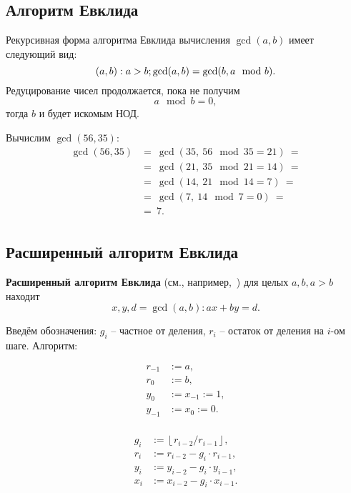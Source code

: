 \subsection{Алгоритм Евклида}

Рекурсивная форма алгоритма Евклида вычисления $\gcd(a,b)$ имеет следующий вид:
    \[\mathbb{(}a,b): a>b;  \gcd(a,b) = \gcd(b, a \mod b). \]
Редуцирование чисел продолжается, пока не получим
    \[ a \mod b = 0, \]
тогда $b$ и будет искомым НОД.

\example
Вычислим $\gcd(56, 35)$:
\[ \begin{array}{ll}
    \gcd(56, 35) & =~ \gcd(35, ~ 56 \mod 35 = 21) ~= \\
    & =~ \gcd(21, ~ 35 \mod 21 = 14) ~= \\
    & =~ \gcd(14, ~ 21 \mod 14 = 7) ~= \\
    & =~ \gcd(7, ~ 14 \mod 7 = 0) ~= \\
    & =~ 7. \\
\end{array} \]
\exampleend


\subsection{Расширенный алгоритм Евклида}

\textbf{Расширенный алгоритм Евклида} (см., например,~\cite[8.8 Наибольшие общие делители и алгоритм Евклида]{Aho:1979}) для целых $a, b, a > b$ находит
    \[ x, y, d = \gcd(a,b): ax + by = d. \]

Введём обозначения: $g_i$ -- частное от деления, $r_i$ -- остаток от деления на $i$-ом шаге. Алгоритм:

\[\begin{array}{ll}
	r_{-1} & := a, \\
	r_0 & := b, \\
	y_0 & := x_{-1} := 1, \\
	y_{-1} & := x_0 := 0. \\
\end{array}\]

\[\begin{array}{ll}
	g_i & := \left\lfloor r_{i-2} / r_{i-1} \right\rfloor, \\
	r_i & := r_{i-2} - g_i \cdot r_{i-1}, \\
	y_i & := y_{i-2} - g_i \cdot y_{i-1} , \\
	x_i & := x_{i-2} - g_i \cdot x_{i-1} . \\
\end{array}\]

